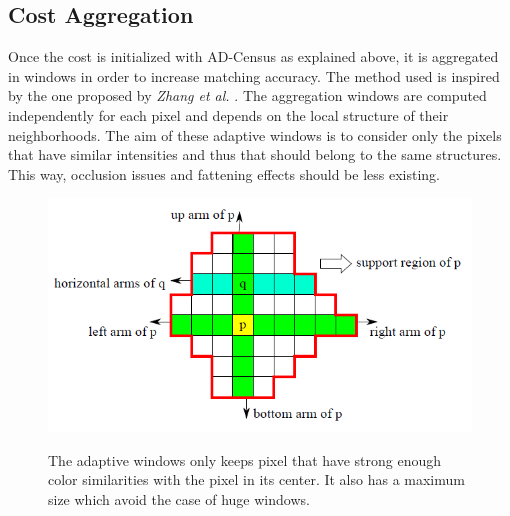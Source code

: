 \documentclass{article}
\begin{document}
\subsection{ Cost Aggregation }

Once the cost is initialized with AD-Census as explained above, it is aggregated in windows in order to increase matching accuracy. The method used is inspired by the one proposed by \textit{ Zhang et al.} \cite{costAggreg}.
The aggregation windows are computed independently for each pixel and depends on the local structure of their neighborhoods. The aim of these adaptive windows is to consider only the pixels that have similar intensities and thus that should belong to the same structures. This way, occlusion issues and fattening effects should be less existing.\\

\begin{figure}[h]
\begin{center}	
\includegraphics[scale=0.8]{Images/cost_computation.png}
	\label{cost_computation}
	\caption{ The adaptive windows only keeps pixel that have strong enough color similarities with the pixel in its center. It also has a maximum size which avoid the case of huge windows.}
\end{center}
\end{figure}

\newpage
\end{document}
